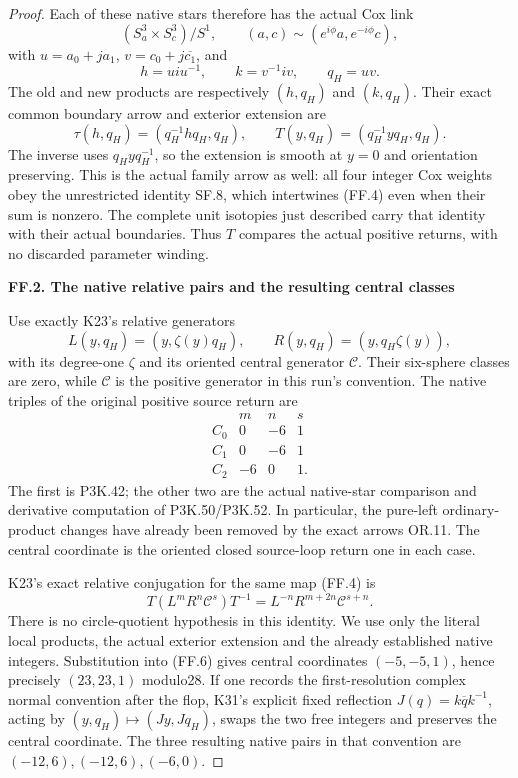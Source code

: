 \begin{proof}
Each of these native stars therefore has the actual Cox link
\[
 (S^3_a\times S^3_c)/S^1,\qquad
 (a,c)\sim(e^{i\phi}a,e^{-i\phi}c),
\]
with \(u=a_0+ja_1\), \(v=c_0+j\overline{c_1}\), and
\[
 h=uiu^{-1},\qquad k=v^{-1}iv,\qquad q_H=uv.
\]
The old and new products are respectively \((h,q_H)\) and
\((k,q_H)\). Their exact common boundary arrow and exterior
extension are
\[
 \tau(h,q_H)=(q_H^{-1}hq_H,q_H),\qquad
 T(y,q_H)=(q_H^{-1}yq_H,q_H).                         \tag{FF.4}
\]
The inverse uses \(q_Hyq_H^{-1}\), so the extension is smooth at
\(y=0\) and orientation preserving. This is the actual family arrow
as well: all four integer Cox weights obey the unrestricted
identity SF.8, which intertwines (FF.4) even when their sum is
nonzero. The complete unit isotopies just described carry that
identity with their actual boundaries. Thus \(T\) compares the
actual positive returns, with no discarded parameter winding.

\par

\medskip\noindent\textbf{FF.2. The native relative pairs and the resulting central classes}

\par\nobreak

Use exactly K23's relative generators
\[
 L(y,q_H)=(y,\zeta(y)q_H),\qquad
 R(y,q_H)=(y,q_H\zeta(y)),
\]
with its degree-one \(\zeta\) and its oriented central generator
\(\mathcal C\). Their six-sphere classes are zero, while
\(\mathcal C\) is the positive generator in this run's convention.
The native triples of the original positive source return are
\[
 \begin{array}{c|rrr}
 &m&n&s\\ \hline
 C_0&0&-6&1\\
 C_1&0&-6&1\\
 C_2&-6&0&1.
 \end{array}                                             \tag{FF.5}
\]
The first is P3K.42; the other two are the actual native-star
comparison and derivative computation of P3K.50/P3K.52. In
particular, the pure-left ordinary-product changes have already
been removed by the exact arrows OR.11. The central coordinate is
the oriented closed source-loop return one in each case.

K23's exact relative conjugation for the same map (FF.4) is
\[
 T(L^mR^n\mathcal C^s)T^{-1}
       =L^{-n}R^{m+2n}\mathcal C^{s+n}.              \tag{FF.6}
\]
There is no circle-quotient hypothesis in this identity. We use
only the literal local products, the actual exterior extension and
the already established native integers. Substitution into (FF.6)
gives central coordinates \((-5,-5,1)\), hence precisely
\((23,23,1)\) modulo28. If one records the first-resolution complex
normal convention after the flop, K31's explicit fixed reflection
\(J(q)=k\overline qk^{-1}\), acting by
\((y,q_H)\mapsto(Jy,Jq_H)\), swaps the two free integers and
preserves the central coordinate. The three resulting native pairs
in that convention are \((-12,6),(-12,6),(-6,0)\).


\end{proof}
